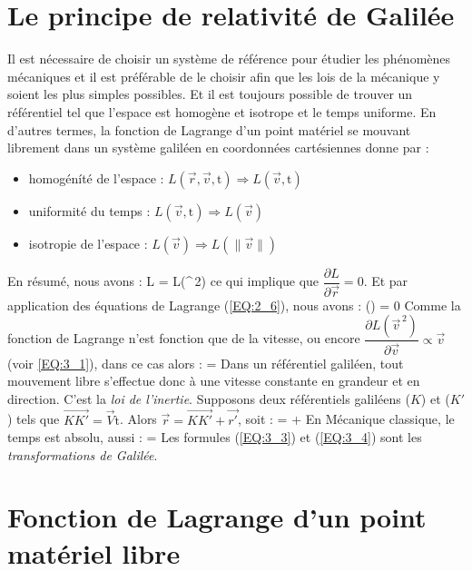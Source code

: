 \section{Le principe de relativit\'e de Galil\'ee}

Il est n\'ecessaire de choisir un syst\`eme de r\'ef\'erence pour \'etudier les ph\'enom\`enes m\'ecaniques et il est pr\'ef\'erable de le choisir afin que les lois de la m\'ecanique y soient les plus simples possibles. Et il est toujours possible de trouver un r\'ef\'erentiel tel que l'espace est homog\`ene et isotrope et le temps uniforme. En d'autres termes, la fonction de Lagrange d'un point mat\'eriel se mouvant librement dans un syst\`eme galil\'een en coordonn\'ees cart\'esiennes donne par :
\begin{itemize}
	\item homog\'en\'it\'e de l'espace : $L(\vec{r},\vec{v},\mathrm{t}) \Rightarrow L(\vec{v},\mathrm{t})$
	\item uniformit\'e du temps : $L(\vec{v},\mathrm{t}) \Rightarrow L(\vec{v})$
	\item isotropie de l'espace : $L(\vec{v}) \Rightarrow L(\lVert\vec{v}\rVert)$
\end{itemize}
En r\'esum\'e, nous avons :
\be
	L = L(^{\,2}) \label{EQ:3_1}
\ee
ce qui implique que $\dfrac{\partial L}{\partial \vec{r}} = 0$. Et par application des \'equations de Lagrange (\ref{EQ:2_6}), nous avons :
\benn
	\left(\right) = 0
\eenn
Comme la fonction de Lagrange n'est fonction que de la vitesse, ou encore $\dfrac{\partial L({\vec{v}}^{\,2})}{\partial \vec{v}} \propto \vec{v}$ (voir \ref{EQ:3_1}), dans ce cas alors :
\be
	 =  \label{EQ:3_2}
\ee
Dans un r\'ef\'erentiel galil\'een, tout mouvement libre s'effectue donc \`a une vitesse constante en grandeur et en direction. C'est la \emph{loi de l'inertie}. Supposons deux r\'ef\'erentiels galil\'eens ($K$) et ($K'$) tels que $\vec{KK'}=\vec{V}\mathrm{t}$. Alors $\vec{r}=\vec{KK'}+\vec{r'}$, soit :
\be
	 =  +  \label{EQ:3_3}
\ee
En M\'ecanique classique, le temps est absolu, aussi :
\be
	 =  \label{EQ:3_4}
\ee
Les formules (\ref{EQ:3_3}) et (\ref{EQ:3_4}) sont les \emph{transformations de Galil\'ee}.

\section{Fonction de Lagrange d'un point mat\'eriel libre}

